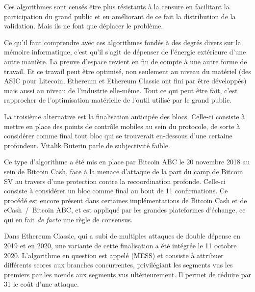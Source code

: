 Ces algorithmes sont censés être plus résistants à la censure en facilitant la participation du grand public et en améliorant de ce fait la distribution de la validation. Mais ils ne font que déplacer le problème.

Ce qu'il faut comprendre avec ces algorithmes fondés à des degrés divers sur la mémoire informatique, c'est qu'il s'agit de dépenser de l'énergie extérieure d'une autre manière. La preuve d'espace revient en fin de compte à une autre forme de travail. Et ce travail peut être optimisé, non seulement au niveau du matériel (des ASIC pour Litecoin, Ethereum et Ethereum Classic ont fini par être développés) mais aussi au niveau de l'industrie elle-même. Tout ce qui peut être fait, c'est rapprocher de l'optimisation matérielle de l'outil utilisé par le grand public.


La troisième alternative est la finalisation anticipée des blocs. Celle-ci consiste à mettre en place des points de contrôle mobiles au sein du protocole, de sorte à considérer comme final tout bloc qui se trouverait en-dessous d'une certaine profondeur. Vitalik Buterin parle de subjectivité faible.

Ce type d'algorithme a été mis en place par Bitcoin ABC le 20 novembre 2018 au sein de Bitcoin Cash, face à la menace d'attaque de la part du camp de Bitcoin SV au travers d'une protection contre la recoordination profonde. Celle-ci consiste à considérer un bloc comme final au bout de 11 confirmations. Ce procédé est encore présent dans certaines implémentations de Bitcoin Cash et de eCash~/~Bitcoin ABC, et est appliqué par les grandes plateformes d'échange, ce qui en fait \emph{de facto} une règle de consensus. %

Dans Ethereum Classic, qui a subi de multiples attaques de double dépense en 2019 et en 2020, une variante de cette finalisation a été intégrée le 11 octobre 2020. L'algorithme en question est appelé  (MESS) et consiste à attribuer différents scores aux branches concurrentes, privilégiant les segments vus les premiers par les nœuds aux segments vus ultérieurement. Il permet de réduire par 31 le coût d'une attaque.

